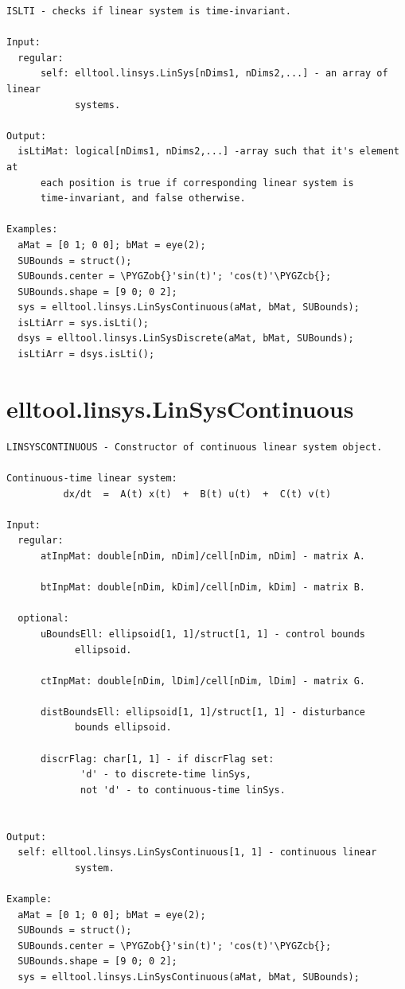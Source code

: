 \documentclass[letterpaper,10pt,english]{sphinxmanual}
\def\PYGZob{\char`\{}
\def\PYGZcb{\char`\}}
\begin{document}
\begin{Verbatim}[commandchars=\\\{\}]
ISLTI - checks if linear system is time-invariant.

Input:
  regular:
      self: elltool.linsys.LinSys[nDims1, nDims2,...] - an array of linear
            systems.

Output:
  isLtiMat: logical[nDims1, nDims2,...] -array such that it's element at
      each position is true if corresponding linear system is
      time-invariant, and false otherwise.

Examples:
  aMat = [0 1; 0 0]; bMat = eye(2);
  SUBounds = struct();
  SUBounds.center = \PYGZob{}'sin(t)'; 'cos(t)'\PYGZcb{};
  SUBounds.shape = [9 0; 0 2];
  sys = elltool.linsys.LinSysContinuous(aMat, bMat, SUBounds);
  isLtiArr = sys.isLti();
  dsys = elltool.linsys.LinSysDiscrete(aMat, bMat, SUBounds);
  isLtiArr = dsys.isLti();
\end{Verbatim}


\section{elltool.linsys.LinSysContinuous}
\label{chap_func:elltool-linsys-linsyscontinuous}
\begin{Verbatim}[commandchars=\\\{\}]
LINSYSCONTINUOUS - Constructor of continuous linear system object.

Continuous-time linear system:
          dx/dt  =  A(t) x(t)  +  B(t) u(t)  +  C(t) v(t)

Input:
  regular:
      atInpMat: double[nDim, nDim]/cell[nDim, nDim] - matrix A.

      btInpMat: double[nDim, kDim]/cell[nDim, kDim] - matrix B.

  optional:
      uBoundsEll: ellipsoid[1, 1]/struct[1, 1] - control bounds
            ellipsoid.

      ctInpMat: double[nDim, lDim]/cell[nDim, lDim] - matrix G.

      distBoundsEll: ellipsoid[1, 1]/struct[1, 1] - disturbance
            bounds ellipsoid.

      discrFlag: char[1, 1] - if discrFlag set:
             'd' - to discrete-time linSys,
             not 'd' - to continuous-time linSys.


Output:
  self: elltool.linsys.LinSysContinuous[1, 1] - continuous linear
            system.

Example:
  aMat = [0 1; 0 0]; bMat = eye(2);
  SUBounds = struct();
  SUBounds.center = \PYGZob{}'sin(t)'; 'cos(t)'\PYGZcb{};
  SUBounds.shape = [9 0; 0 2];
  sys = elltool.linsys.LinSysContinuous(aMat, bMat, SUBounds);
\end{Verbatim}
\end{document}
